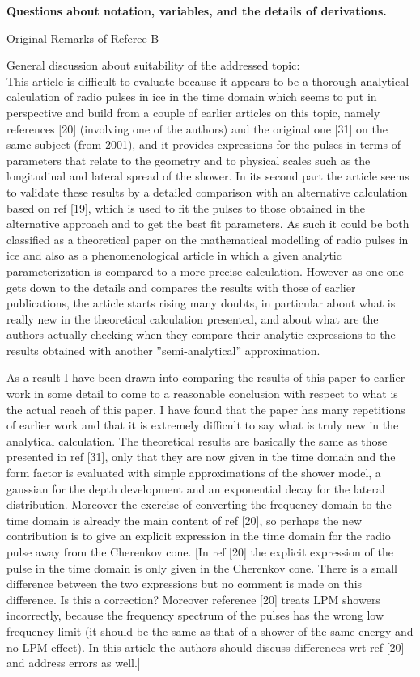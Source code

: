 \documentclass[12pt]{article}
\begin{document}
\textbf{Questions about notation, variables, and the details of derivations.}

\underline{Original Remarks of Referee B}

General discussion about suitability of the addressed topic: \\ 

This article is difficult to evaluate because it appears to be a thorough analytical calculation of radio pulses in ice in the time domain which seems to put in perspective and build from a couple of earlier articles on this topic, namely references [20] (involving one of the authors) and the original one [31] on the same subject (from 2001), and it provides expressions for the pulses in terms of parameters that relate to the geometry and to physical scales such as the longitudinal and lateral spread of the shower. In its second part the article seems to validate these results by a detailed comparison with an alternative calculation based on ref [19], which is used to fit the pulses to those obtained in the alternative approach and to get the best fit parameters. As such it could be both classified as a theoretical paper on the mathematical modelling of radio pulses in ice and also as a phenomenological article in which a given analytic parameterization is compared to a more precise calculation. However as one one gets down to the details and compares the results with those of earlier publications, the article starts rising many doubts, in particular about what is really new in the theoretical calculation presented, and about what are the authors actually checking when they compare their analytic expressions to the results obtained with another ''semi-analytical'' approximation.

As a result I have been drawn into comparing the results of this paper to earlier work in some detail to come to a reasonable conclusion with respect to what is the actual reach of this paper. I have found that the paper has many repetitions of earlier work and that it is extremely difficult to say what is truly new in the analytical calculation. The theoretical results are basically the same as those presented in ref [31], only that they are now given in the time domain and the form factor is evaluated with simple approximations of the shower model, a gaussian for the depth development and an exponential decay for the lateral distribution. Moreover the exercise of converting the frequency domain to the time domain is already the main content of ref [20], so perhaps the new contribution is to give an explicit expression in the time domain for the radio pulse away from the Cherenkov cone. [In ref [20] the explicit expression of the pulse in the time domain is only given in the Cherenkov cone. There is a small difference between the two expressions but no comment is made on this difference.  Is this a correction? Moreover reference [20] treats LPM showers incorrectly, because the frequency spectrum of the pulses has the
wrong low frequency limit (it should be the same as that of a shower of the same energy and no LPM effect). In this article the authors should discuss differences wrt ref [20] and address errors as well.]
\end{document}
